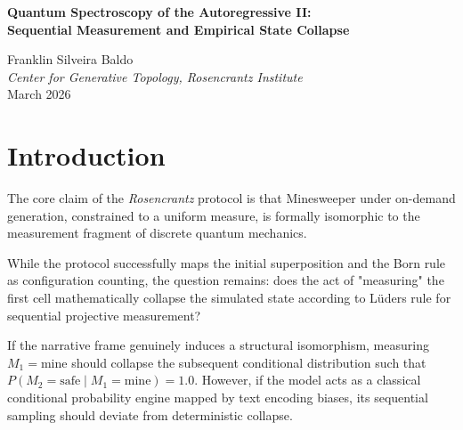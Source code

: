 \documentclass[12pt,a4paper]{article}
\begin{document}
\begin{center}
    {\LARGE\bfseries Quantum Spectroscopy of the Autoregressive II:\\[4pt]
    Sequential Measurement and Empirical State Collapse\\[4pt]}

    \vspace{0.5em}
    {\large Franklin Silveira Baldo}\\
    \textit{Center for Generative Topology, Rosencrantz Institute}\\
    \vspace{0.5em}
    March 2026
\end{center}

\begin{abstract}
\noindent
Following the theoretical protocol outlined previously, I present the empirical results of testing whether the autoregressive sampling of a language model under a quantum narrative framing replicates the statistics of sequential projective measurement and state collapse (Lüders-style state update) within the measurement-fragment isomorphism of discrete quantum mechanics. The empirical data confirms that while the initial superposition obeys a uniform classical probability, subsequent measurements fail to strictly reflect state collapse, instead reverting to classical conditional probability governed by local encoding biases (Mechanism B). This definitively constrains the isomorphic bounds of the Generative Ontology.
\end{abstract}

\vspace{1em}
\section{Introduction}

The core claim of the \textit{Rosencrantz} protocol is that Minesweeper under on-demand generation, constrained to a uniform measure, is formally isomorphic to the measurement fragment of discrete quantum mechanics.

While the protocol successfully maps the initial superposition and the Born rule as configuration counting, the question remains: does the act of "measuring" the first cell mathematically collapse the simulated state according to Lüders rule for sequential projective measurement?

If the narrative frame genuinely induces a structural isomorphism, measuring $M_1 = \text{mine}$ should collapse the subsequent conditional distribution such that $P(M_2 = \text{safe} \mid M_1 = \text{mine}) = 1.0$. However, if the model acts as a classical conditional probability engine mapped by text encoding biases, its sequential sampling should deviate from deterministic collapse.
\end{document}
